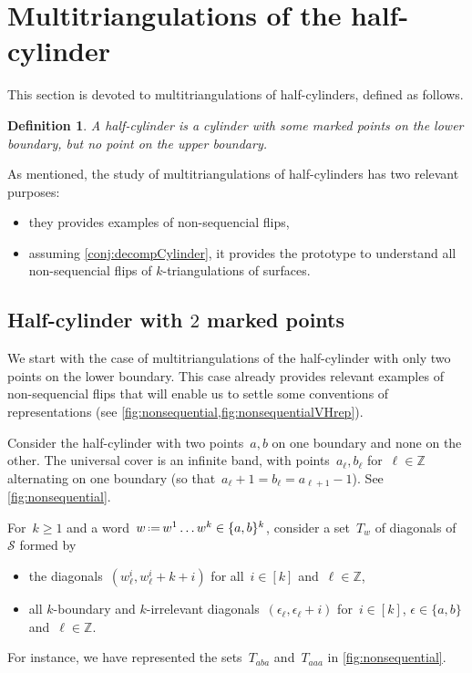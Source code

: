 \documentclass{amsart}
\newtheorem{definition}[theorem]{Definition}
\theoremstyle{remark}
\newcommand{\darkblue}{\color{darkblue}} %
\newcommand{\defn}[1]{\textsl{\darkblue #1}} %
\newcommand{\Z}{\mathbb{Z}} %
\newcommand{\eqdef}{\mbox{\,\raisebox{0.2ex}{\scriptsize\ensuremath{\mathrm:}}\ensuremath{=}\,}} %
\newcommand{\surface}{\mathcal{S}}
\begin{document}

\section{Multitriangulations of the half-cylinder}
\label{sec:halfCylinder}

This section is devoted to multitriangulations of half-cylinders, defined as follows.

\begin{definition}
A \defn{half-cylinder} is a cylinder with some marked points on the lower boundary, but no point on the upper boundary.
\end{definition}

As mentioned, the study of multitriangulations of half-cylinders has two relevant purposes:
\begin{itemize}
\item they provides examples of non-sequencial flips,
\item assuming \cref{conj:decompCylinder}, it provides the prototype to understand all non-sequencial flips of $k$-triangulations of surfaces.
\end{itemize}



\subsection{Half-cylinder with $2$ marked points}

We start with the case of multitriangulations of the half-cylinder with only two points on the lower boundary.
This case already provides relevant examples of non-sequencial flips that will enable us to settle some conventions of representations (see \cref{fig:nonsequential,fig:nonsequentialVHrep}).

Consider the half-cylinder with two points~$a,b$ on one boundary and none on the other.
The universal cover is an infinite band, with points~$a_{\ell}, b_{\ell}$ for~$\ell \in \Z$ alternating on one boundary (so that~$a_\ell+1 = b_\ell = a_{\ell+1}-1$).
See \cref{fig:nonsequential}.

For~$k \ge 1$ and a word~$w \eqdef w^1 \dots w^k  \in \{a,b\}^k$, consider a set~$T_w$ of diagonals of~$\surface$ formed by
\begin{itemize}
\item the diagonals~$(w^i_\ell, w^i_{\ell}+k+i)$ for all~$i \in [k]$ and~$\ell \in \Z$,
\item all $k$-boundary and $k$-irrelevant diagonals~$(\epsilon_{\ell}, \epsilon_{\ell}+i)$ for~$i \in [k]$, $\epsilon \in \{a,b\}$ and~$\ell \in \Z$.
\end{itemize}
For instance, we have represented the sets~$T_{aba}$ and~$T_{aaa}$ in \cref{fig:nonsequential}.
\end{document}
